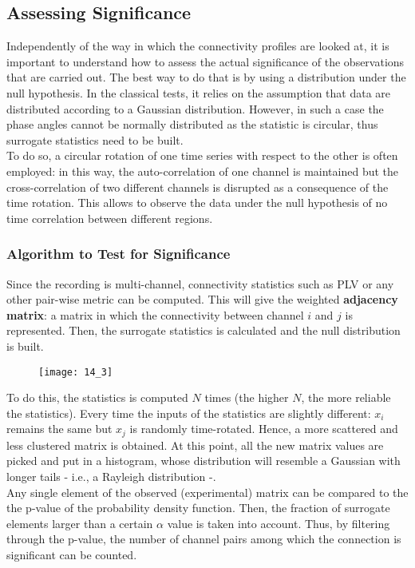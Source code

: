 \subsection{Assessing Significance}
Independently of the way in which the connectivity profiles are looked at, it is important to understand
how to assess the actual significance of the observations that are carried out. The best way to do that
is by using a distribution under the null hypothesis. In the classical tests, it relies on the
assumption that data are distributed according to a Gaussian distribution. However, in such a case the
phase angles cannot be normally distributed as the statistic is circular, thus surrogate statistics need
to be built.\\
To do so, a circular rotation of one time series with respect to the other is often employed: in this way,
the auto-correlation of one channel is maintained but the cross-correlation of two different channels is
disrupted as a consequence of the time rotation. This allows to observe the data under the null
hypothesis of no time correlation between different regions.
\subsubsection{Algorithm to Test for Significance}
Since the recording is multi-channel, connectivity statistics such as PLV or any other pair-wise metric
can be computed. This will give the weighted \textbf{adjacency matrix}: a matrix in which the
connectivity between channel \(i\) and \(j\) is represented. Then, the surrogate statistics is calculated
and the null distribution is built.
\begin{figure}[H]
    \centering
    \texttt{[image: 14\_3]}
\end{figure}
To do this, the statistics is computed \(N\) times (the higher \(N\), the more reliable the statistics).
Every time the inputs of the statistics are slightly different: \(x_i\) remains the same but \(x_j\) is
randomly time-rotated. Hence, a more scattered and less clustered matrix is obtained. At this point, all
the new matrix values are picked and put in a histogram, whose distribution will resemble a Gaussian with
longer tails - i.e., a Rayleigh distribution -.\\
Any single element of the observed (experimental) matrix can be compared to the the p-value of the
probability density function. Then, the fraction of surrogate elements larger than a certain \(\alpha\)
value is taken into account. Thus, by filtering through the p-value, the number of channel pairs among
which the connection is significant can be counted.
